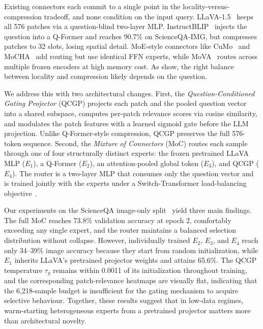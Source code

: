 \documentclass{article}
\begin{document}
Existing connectors each commit to a single point in the locality-versus-compression tradeoff, and none condition on the input query. LLaVA-1.5~\citep{liu2024llava} keeps all 576 patches via a question-blind two-layer MLP. InstructBLIP~\citep{dai2023instructblip} injects the question into a Q-Former and reaches 90.7\% on ScienceQA-IMG, but compresses patches to 32 slots, losing spatial detail. MoE-style connectors like CuMo~\citep{li2024cumo} and MoCHA~\citep{pang2026mocha} add routing but use identical FFN experts, while MoVA~\citep{zong2024mova} routes across multiple frozen encoders at high memory cost. As \citet{cha2024honeybee} show, the right balance between locality and compression likely depends on the question.

We address this with two architectural changes. First, the \emph{Question-Conditioned Gating Projector} (QCGP) projects each patch and the pooled question vector into a shared subspace, computes per-patch relevance scores via cosine similarity, and modulates the patch features with a learned sigmoid gate before the LLM projection. Unlike Q-Former-style compression, QCGP preserves the full 576-token sequence. Second, the \emph{Mixture of Connectors} (MoC) routes each sample through one of four structurally distinct experts: the frozen pretrained LLaVA MLP ($E_1$), a Q-Former ($E_2$), an attention-pooled global token ($E_3$), and QCGP ($E_4$). The router is a two-layer MLP that consumes only the question vector and is trained jointly with the experts under a Switch-Transformer load-balancing objective~\citep{fedus2022switch}.

Our experiments on the ScienceQA image-only split~\citep{lu2022scienceqa} yield three main findings. The full MoC reaches 73.8\% validation accuracy at epoch 2, comfortably exceeding any single expert, and the router maintains a balanced selection distribution without collapse. However, individually trained $E_2$, $E_3$, and $E_4$ reach only 34--39\% image accuracy because they start from random initialization, while $E_1$ inherits LLaVA's pretrained projector weights and attains 65.6\%. The QCGP temperature $\tau_g$ remains within 0.0011 of its initialization throughout training, and the corresponding patch-relevance heatmaps are visually flat, indicating that the 6{,}218-sample budget is insufficient for the gating mechanism to acquire selective behaviour. Together, these results suggest that in low-data regimes, warm-starting heterogeneous experts from a pretrained projector matters more than architectural novelty.
\end{document}
